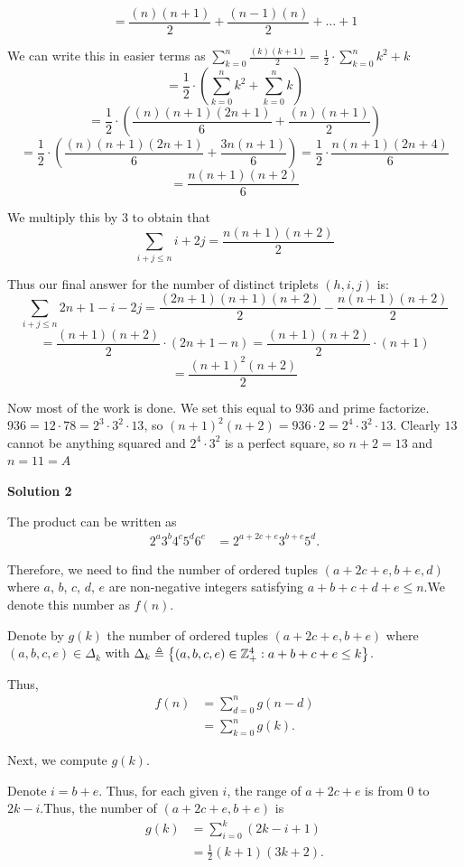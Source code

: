 \begin{enumerate}
 \[= \frac{(n)(n+1)}{2} + \frac{(n-1)(n)}{2}+ \dots + 1\]

 We can write this in easier terms as $\sum_{k=0}^{n} \frac{(k)(k+1)}{2} = \frac{1}{2} \cdot \sum_{k=0}^{n} k^2+k$
 \[=\frac{1}{2} \cdot( \sum_{k=0}^{n} k^2 + \sum_{k=0}^{n} k)\]
 \[= \frac{1}{2} \cdot ( \frac{(n)(n+1)(2n+1)}{6} + \frac{(n)(n+1)}{2})\]
 \[= \frac{1}{2} \cdot ( \frac{(n)(n+1)(2n+1)}{6} + \frac{3n(n+1)}{6}) = \frac{1}{2} \cdot \frac{n(n+1)(2n+4)}{6}\]
 \[= \frac{n(n+1)(n+2)}{6}\]

 We multiply this by $3$ to obtain that 
 \[\sum_{i+j \leq n}^{} i+2j = \frac{n(n+1)(n+2)}{2}\]

 Thus our final answer for the number of distinct triplets $(h,i,j)$ is:
 \[\sum_{i+j\leq n}^{} 2n+1-i-2j = \frac{(2n+1)(n+1)(n+2)}{2} - \frac{n(n+1)(n+2)}{2}\]
 \[= \frac{(n+1)(n+2)}{2} \cdot (2n+1-n) = \frac{(n+1)(n+2)}{2} \cdot (n+1)\]
 \[= \frac{(n+1)^2(n+2)}{2}\]

 Now most of the work is done. We set this equal to $936$ and prime factorize. $936 = 12 \cdot 78 = 2^3 \cdot 3^2 \cdot 13$, so $(n+1)^2(n+2) = 936 \cdot 2 = 2^4 \cdot 3^2 \cdot 13$. Clearly $13$ cannot be anything squared and $2^4 \cdot 3^2$ is a perfect square, so $n+2 = 13$ and $n = 11 = \boxed{A}$




\textbf{Solution 2}

The product can be written as 
 \begin{align*} 2^a 3^b 4^c 5^d 6^e & = 2^{a + 2c + e} 3^{b + e} 5^d . \end{align*}


 Therefore, we need to find the number of ordered tuples $\left( a + 2c + e, b+e, d \right)$ where $a$, $b$, $c$, $d$, $e$ are non-negative integers satisfying $a+b+c+d+e \leq n$.We denote this number as $f(n)$.

 Denote by $g \left( k \right)$ the number of ordered tuples $\left( a + 2c + e, b+e \right)$ where $\left( a, b, c, e \right) \in \Delta_k$ with $\Delta_k \triangleq \left\{ (a,b,c,e) \in \Bbb Z_+^4: a+b+c+e \leq k \right\}$.

 Thus,
 \begin{align*} f \left( n \right) & = \sum_{d = 0}^n g \left( n - d \right) \\ & = \sum_{k = 0}^n g \left( k \right)  . \end{align*}


 Next, we compute $g \left( k \right)$.

 Denote $i = b + e$. Thus, for each given $i$, the range of $a + 2c + e$ is from 0 to $2 k - i$.Thus, the number of $\left( a + 2c + e, b + e \right)$ is
 \begin{align*} g \left( k \right) & = \sum_{i=0}^k \left( 2 k - i + 1 \right) \\ & = \frac{1}{2} \left( k + 1 \right) \left( 3 k + 2 \right) . \end{align*}



\end{enumerate}
